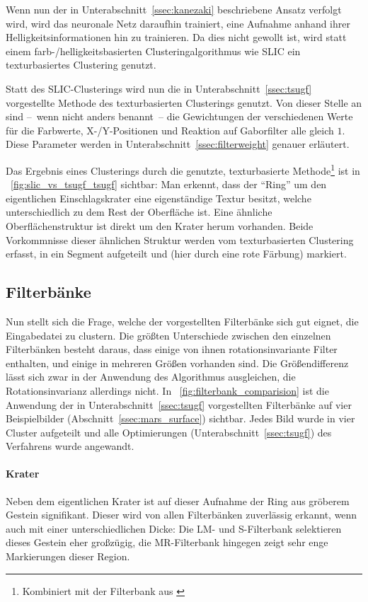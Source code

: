 Wenn nun der in Unterabschnitt~\ref{ssec:kanezaki} beschriebene Ansatz verfolgt wird, wird das neuronale Netz daraufhin trainiert, eine Aufnahme anhand ihrer Helligkeitsinformationen hin zu trainieren. Da dies nicht gewollt ist, wird statt einem farb-/helligkeitsbasierten Clusteringalgorithmus wie SLIC ein texturbasiertes Clustering genutzt.

Statt des SLIC-Clusterings wird nun die in Unterabschnitt~\ref{ssec:tsugf} vorgestellte Methode des texturbasierten Clusterings genutzt. Von dieser Stelle an sind --~wenn nicht anders benannt~-- die Gewichtungen der verschiedenen Werte für die Farbwerte, X-/Y-Positionen und Reaktion auf Gaborfilter alle gleich $1$. Diese Parameter werden in Unterabschnitt~\ref{ssec:filterweight} genauer erläutert.

Das Ergebnis eines Clusterings durch die genutzte, texturbasierte Methode\footnote{Kombiniert mit der Filterbank aus \cite{jain_91}} ist in \figurename~\ref{fig:slic_vs_tsugf_tsugf} sichtbar: Man erkennt, dass der \enquote{Ring} um den eigentlichen Einschlagskrater eine eigenständige Textur besitzt, welche unterschiedlich zu dem Rest der Oberfläche ist. Eine ähnliche Oberflächenstruktur ist direkt um den Krater herum vorhanden. Beide Vorkommnisse dieser ähnlichen Struktur werden vom texturbasierten Clustering erfasst, in ein Segment aufgeteilt und (hier durch eine rote Färbung) markiert.

\subsection{Filterbänke}

Nun stellt sich die Frage, welche der vorgestellten Filterbänke sich gut eignet, die Eingabedatei zu clustern. Die größten Unterschiede zwischen den einzelnen Filterbänken besteht daraus, dass einige von ihnen rotationsinvariante Filter enthalten, und einige in mehreren Größen vorhanden sind. Die Größendifferenz lässt sich zwar in der Anwendung des Algorithmus ausgleichen, die Rotationsinvarianz allerdings nicht. In \figurename~\ref{fig:filterbank_comparision} ist die Anwendung der in Unterabschnitt~\ref{ssec:tsugf} vorgestellten Filterbänke auf vier Beispielbilder (\vgl Abschnitt~\ref{ssec:mars_surface}) sichtbar. Jedes Bild wurde in vier Cluster aufgeteilt und alle Optimierungen (\vgl Unterabschnitt~\ref{ssec:tsugf}) des Verfahrens wurde angewandt.

\paragraph{Krater}
Neben dem eigentlichen Krater ist auf dieser Aufnahme der Ring aus gröberem Gestein signifikant. Dieser wird von allen Filterbänken zuverlässig erkannt, wenn auch mit einer unterschiedlichen Dicke: Die LM- und S-Filterbank selektieren dieses Gestein eher großzügig, die MR-Filterbank hingegen zeigt sehr enge Markierungen dieser Region.

